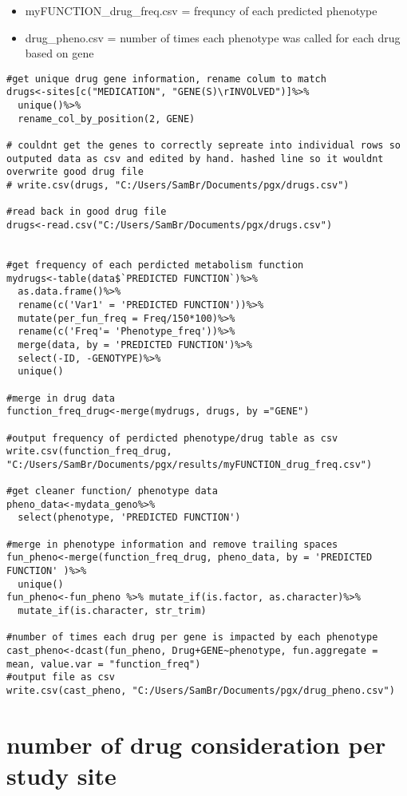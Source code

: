 \documentclass[]{article}
\providecommand{\tightlist}{%
  \setlength{\itemsep}{0pt}\setlength{\parskip}{0pt}}
\begin{document}
\begin{itemize}
\tightlist
\item
  myFUNCTION\_drug\_freq.csv = frequncy of each predicted phenotype
\item
  drug\_pheno.csv = number of times each phenotype was called for each
  drug based on gene
\end{itemize}

\begin{verbatim}
#get unique drug gene information, rename colum to match 
drugs<-sites[c("MEDICATION", "GENE(S)\rINVOLVED")]%>%
  unique()%>%
  rename_col_by_position(2, GENE)

# couldnt get the genes to correctly sepreate into individual rows so outputed data as csv and edited by hand. hashed line so it wouldnt overwrite good drug file
# write.csv(drugs, "C:/Users/SamBr/Documents/pgx/drugs.csv")

#read back in good drug file
drugs<-read.csv("C:/Users/SamBr/Documents/pgx/drugs.csv")


#get frequency of each perdicted metabolism function
mydrugs<-table(data$`PREDICTED FUNCTION`)%>%
  as.data.frame()%>%
  rename(c('Var1' = 'PREDICTED FUNCTION'))%>%
  mutate(per_fun_freq = Freq/150*100)%>%
  rename(c('Freq'= 'Phenotype_freq'))%>%
  merge(data, by = 'PREDICTED FUNCTION')%>%
  select(-ID, -GENOTYPE)%>%
  unique()

#merge in drug data  
function_freq_drug<-merge(mydrugs, drugs, by ="GENE")

#output frequency of perdicted phenotype/drug table as csv 
write.csv(function_freq_drug, "C:/Users/SamBr/Documents/pgx/results/myFUNCTION_drug_freq.csv")

#get cleaner function/ phenotype data
pheno_data<-mydata_geno%>%
  select(phenotype, 'PREDICTED FUNCTION')

#merge in phenotype information and remove trailing spaces
fun_pheno<-merge(function_freq_drug, pheno_data, by = 'PREDICTED FUNCTION' )%>%
  unique()
fun_pheno<-fun_pheno %>% mutate_if(is.factor, as.character)%>%
  mutate_if(is.character, str_trim)

#number of times each drug per gene is impacted by each phenotype
cast_pheno<-dcast(fun_pheno, Drug+GENE~phenotype, fun.aggregate = mean, value.var = "function_freq")
#output file as csv
write.csv(cast_pheno, "C:/Users/SamBr/Documents/pgx/drug_pheno.csv")
\end{verbatim}

\section{number of drug consideration per study
site}\label{number-of-drug-consideration-per-study-site}
\end{document}
